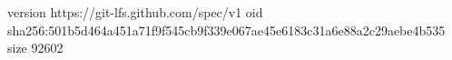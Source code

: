 version https://git-lfs.github.com/spec/v1
oid sha256:501b5d464a451a71f9f545cb9f339e067ae45e6183c31a6e88a2c29aebe4b535
size 92602
